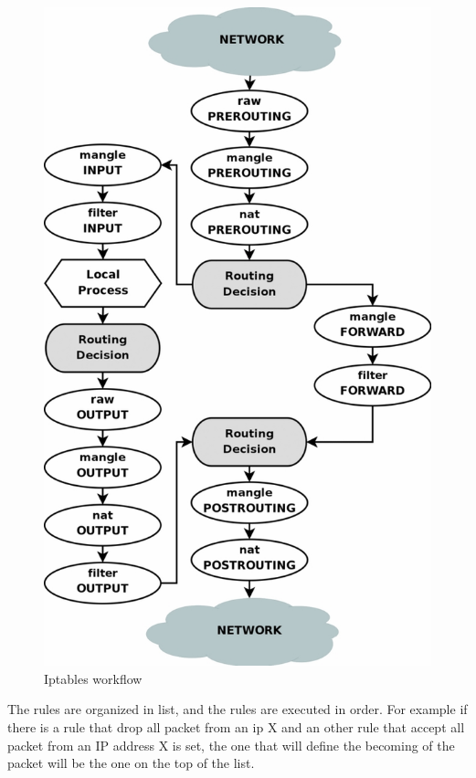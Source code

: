 \documentclass{tnreport}
\begin{document}
\begin{figure}[h!]
  \begin{center}
  \includegraphics[scale=0.4]{figures/ip_tables}
  \caption{Iptables workflow \cite{lib21}}
  \label{iptables}
  \end{center}
\end{figure}

The rules are organized in list, and the rules are executed in order. For example if there is a rule that drop all packet from an ip X and an other rule that accept all packet from an IP address X is set, the one that will define the becoming of the packet will be the one on the top of the list.
\end{document}
